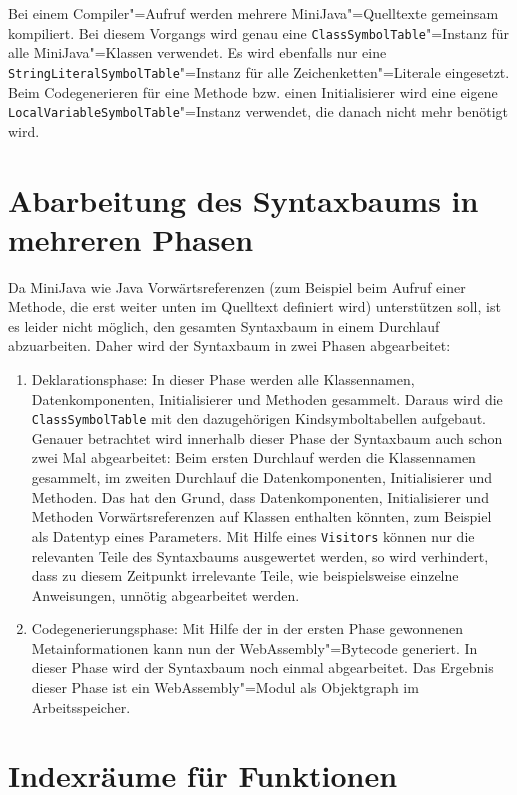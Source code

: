 Bei einem Compiler"=Aufruf werden mehrere MiniJava"=Quelltexte gemeinsam kompiliert. Bei diesem Vorgangs wird genau eine \lstinline{ClassSymbolTable}"=Instanz für alle MiniJava"=Klassen verwendet. Es wird ebenfalls nur eine \lstinline{StringLiteralSymbolTable}"=Instanz für alle Zeichenketten"=Literale eingesetzt. Beim Codegenerieren für eine Methode bzw. einen Initialisierer wird eine eigene \lstinline{LocalVariableSymbolTable}"=Instanz verwendet, die danach nicht mehr benötigt wird.

\section{Abarbeitung des Syntaxbaums in mehreren Phasen}

Da MiniJava wie Java Vorwärtsreferenzen (zum Beispiel beim Aufruf einer Methode, die erst weiter unten im Quelltext definiert wird) unterstützen soll, ist es leider nicht möglich, den gesamten Syntaxbaum in einem Durchlauf abzuarbeiten. Daher wird der Syntaxbaum in zwei Phasen abgearbeitet:

\begin{enumerate}
    \item Deklarationsphase: In dieser Phase werden alle Klassennamen, Datenkomponenten, Initialisierer und Methoden gesammelt. Daraus wird die \lstinline{ClassSymbolTable} mit den dazugehörigen Kindsymboltabellen aufgebaut. Genauer betrachtet wird innerhalb dieser Phase der Syntaxbaum auch schon zwei Mal abgearbeitet: Beim ersten Durchlauf werden die Klassennamen gesammelt, im zweiten Durchlauf die Datenkomponenten, Initialisierer und Methoden. Das hat den Grund, dass Datenkomponenten, Initialisierer und Methoden Vorwärtsreferenzen auf Klassen enthalten könnten, zum Beispiel als Datentyp eines Parameters. Mit Hilfe eines \lstinline{Visitors} können nur die relevanten Teile des Syntaxbaums ausgewertet werden, so wird verhindert, dass zu diesem Zeitpunkt irrelevante Teile, wie beispielsweise einzelne Anweisungen, unnötig abgearbeitet werden.
    \item Codegenerierungsphase: Mit Hilfe der in der ersten Phase gewonnenen Metainformationen kann nun der WebAssembly"=Bytecode generiert. In dieser Phase wird der Syntaxbaum noch einmal abgearbeitet. Das Ergebnis dieser Phase ist ein WebAssembly"=Modul als Objektgraph im Arbeitsspeicher.
\end{enumerate}

\section{Indexräume für Funktionen}

